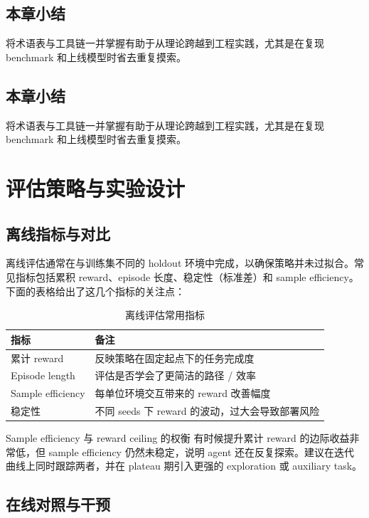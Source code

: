 \documentclass[a4paper]{article}
\begin{document}
\subsection{本章小结}

将术语表与工具链一并掌握有助于从理论跨越到工程实践，尤其是在复现 benchmark 和上线模型时省去重复摸索。

 \subsection{本章小结}

将术语表与工具链一并掌握有助于从理论跨越到工程实践，尤其是在复现 benchmark 和上线模型时省去重复摸索。

\section{评估策略与实验设计}

\subsection{离线指标与对比}

离线评估通常在与训练集不同的 holdout 环境中完成，以确保策略并未过拟合。常见指标包括累积 reward、episode 长度、稳定性（标准差）和 sample efficiency。下面的表格给出了这几个指标的关注点：

\begin{table}[H]
\centering
\begin{tabular}{lp{8cm}}
\toprule
指标 & 备注 \\
\midrule
累计 reward & 反映策略在固定起点下的任务完成度 \\
Episode length & 评估是否学会了更简洁的路径 / 效率 \\
Sample efficiency & 每单位环境交互带来的 reward 改善幅度 \\
稳定性 & 不同 seeds 下 reward 的波动，过大会导致部署风险 \\
\bottomrule
\end{tabular}
\caption{离线评估常用指标}
\end{table}

\begin{importantbox}{Sample efficiency 与 reward ceiling 的权衡}
有时候提升累计 reward 的边际收益非常低，但 sample efficiency 仍然未稳定，说明 agent 还在反复探索。建议在迭代曲线上同时跟踪两者，并在 plateau 期引入更强的 exploration 或 auxiliary task。
\end{importantbox}

\subsection{在线对照与干预}
\end{document}
